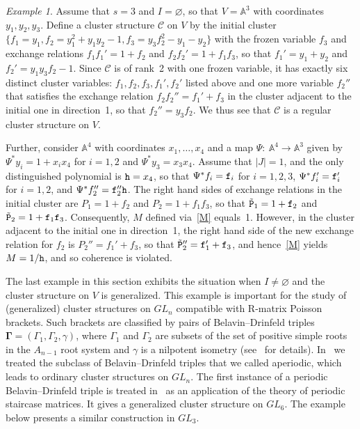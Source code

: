 \documentclass{amsart}
\theoremstyle{definition}
\theoremstyle{remark}
\newtheorem{example}[theorem]{Example}
\numberwithin{equation}{section}
\numberwithin{theorem}{section}
\def\AA{{\mathbb A}}
\def\CC{{\mathcal C}}
\def\bfG{{\mathbf \Gamma}}
\def\ttf{{\tt f}}
\def\tth{{\tt h}}
\def\:{{:\ }}
\begin{document}
\begin{example} \label{badex2}
Assume that $s=3$ and $I=\varnothing$, so that $V=\AA^3$ with coordinates $y_1, y_2, y_3$. 
Define a cluster structure $\CC$ on $V$ 
by the initial cluster $\{f_1=y_1, f_2=y_1^2+y_1y_2-1, f_3=y_3f_2^2-y_1-y_2\}$ with the frozen variable $f_3$ and  exchange relations $f_1f_1'=1+f_2$ and $f_2f_2'=1+f_1f_3$, so that $f_1'=y_1+y_2$ and $f_2'=y_1y_3f_2-1$. Since $\CC$
is of rank~2 with one frozen variable, it has exactly six distinct cluster variables: $f_1, f_2, f_3, f_1', f_2'$ listed above and one more variable 
$f_2''$ that satisfies the exchange relation $f_2f_2''=f_1'+f_3$ in the cluster adjacent to the initial one in 
direction~1, so that $f_2''=y_3f_2$. We thus see that $\CC$ is a regular cluster structure on $V$.

Further, consider $\AA^4$ with coordinates $x_1,\dots,x_4$ and a map $\Psi\:\AA^4\to\AA^3$ given by
$\Psi^*y_i=1+x_ix_4$ for $i=1,2$ and $\Psi^*y_3=x_3x_4$. Assume that $|J|=1$, and the only distinguished polynomial is 
$\tth=x_4$, so that $\Psi^*f_i=\ttf_i$ for $i=1,2,3$, $\Psi^*f_i'=\ttf_i'$ for $i=1,2$, and 
$\Psi^*f_2''=\ttf_2''\tth$. The right hand sides of exchange relations in the initial cluster are $P_1=1+f_2$ and 
$P_2=1+f_1f_3$, so that $\tilde{\tt P}_1=1+\ttf_2$ and $\tilde{\tt P}_2=1+\ttf_1\ttf_3$. Consequently, $M$
defined via~\eqref{M} equals~1. However, in the cluster adjacent to the initial one in 
direction~1, the right hand side of the new exchange relation for $f_2$ is $P_2''=f_1'+f_3$, so that 
$\tilde{\tt P}''_2=\ttf_1'+\ttf_3$, and hence~\eqref{M} yields 
$M=1/\tth$, and so coherence is violated.
\end{example}

The last example in this section exhibits the situation when $I\ne\varnothing$ and the cluster structure on $V$ is generalized. This example is important for the study of (generalized) cluster structures on $GL_n$ compatible with R-matrix Poisson brackets. Such brackets are classified by pairs of 
Belavin--Drinfeld triples $\bfG= (\Gamma_1,\Gamma_2,\gamma)$, where $\Gamma_1$ and $\Gamma_2$ 
are subsets of the set of positive simple roots in the $A_{n-1}$ root system and $\gamma$ 
is a nilpotent isometry (see~\cite{GSVple} for details). In~\cite{GSVple} we treated the subclass
of Belavin--Drinfeld triples that we called aperiodic, which leads to ordinary cluster structures on $GL_n$. 
The first instance of a periodic
Belavin--Drinfeld triple is treated in~\cite[Section~6]{GSVpest} as an application of the theory of periodic staircase matrices. It gives a generalized cluster structure on $GL_6$. The example below presents a similar construction in $GL_3$.
\end{document}
